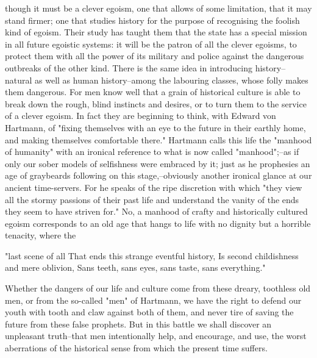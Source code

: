 though it must be a clever egoism, one that allows of some
limitation, that it may stand firmer; one that studies history for
the purpose of recognising the foolish kind of egoism. Their study
has taught them that the state has a special mission in all future
egoistic systems: it will be the patron of all the clever egoisms, to
protect them with all the power of its military and police against
the dangerous outbreaks of the other kind. There is the same idea in
introducing history--natural as well as human history--among the
labouring classes, whose folly makes them dangerous. For men know
well that a grain of historical culture is able to break down the
rough, blind instincts and desires, or to turn them to the service of
a clever egoism. In fact they are beginning to think, with Edward von
Hartmann, of "fixing themselves with an eye to the future in their
earthly home, and making themselves comfortable there." Hartmann
calls this life the "manhood of humanity" with an ironical reference
to what is now called "manhood";--as if only our sober models of
selfishness were embraced by it; just as he prophesies an age of
graybeards following on this stage,--obviously another ironical
glance at our ancient time-servers. For he speaks of the ripe
discretion with which "they view all the stormy passions of their
past life and understand the vanity of the ends they seem to have
striven for." No, a manhood of crafty and historically cultured
egoism corresponds to an old age that hangs to life with no dignity
but a horrible tenacity, where the

                           "last scene of all
  That ends this strange eventful history,
  Is second childishness and mere oblivion,
  Sans teeth, sans eyes, sans taste, sans everything."

Whether the dangers of our life and culture come from these dreary,
toothless old men, or from the so-called "men" of Hartmann, we have
the right to defend our youth with tooth and claw against both of
them, and never tire of saving the future from these false prophets.
But in this battle we shall discover an unpleasant truth--that men
intentionally help, and encourage, and use, the worst aberrations of
the historical sense from which the present time suffers.

